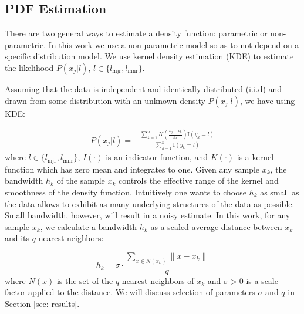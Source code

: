 \documentclass[10pt,journal,compsoc]{IEEEtran}
\begin{document}
\subsection{PDF Estimation}
There are two general ways to estimate a density function: parametric or non-parametric. In this work we use a non-parametric model so as to not depend on a specific distribution model. We use kernel density estimation (KDE) \cite{elgammal2002background}\cite{zhang2006bayesian} to estimate the likelihood $P(x_j|l)$, $l\in \{l_{\mbox{mjr}}, l_{\mbox{mnr}}\}$.

Assuming that the data is independent and identically distributed (i.i.d) and drawn from some distribution with an unknown density $P(x_j | l)$, we have using KDE:

\begin{equation}
\begin{split}
P(x_j | l) =& \frac{\sum_{k=1}^n K(\frac{x_j-x_k}{h_k}) \mathrm{I}(y_k=l)}{\sum_{k=1}^n \mathrm{I}(y_k=l)}
\end{split}
\end{equation}
where $l \in \{l_{\mbox{mjr}}, l_{\mbox{mnr}}\}$, $I(\cdot)$ is an indicator function, and $K(\cdot)$ is a kernel function which has zero mean and integrates to one. Given any sample $x_k$, the bandwidth $h_k$ of the sample $x_k$ controls the effective range of the kernel and smoothness of the density function. Intuitively one wants to choose $h_k$ as small as the data allows to exhibit as many underlying structures of the data as possible. Small bandwidth, however, will result in a noisy estimate. In this work, for any sample $x_k$, we calculate a bandwidth $h_k$ as a scaled average distance between $x_k$ and its $q$ nearest neighbors:

\begin{equation}
h_k = \sigma \cdot \frac{\sum_{x \in N(x_k)} \| x-x_k \|}{q}
\label{eqn: sigma}
\end{equation}
where $N(x)$ is the set of the $q$ nearest neighbors of $x_k$ and $\sigma > 0$ is a scale factor applied to the distance. We will discuss selection of parameters $\sigma$ and $q$ in Section \ref{sec: results}.
\end{document}
